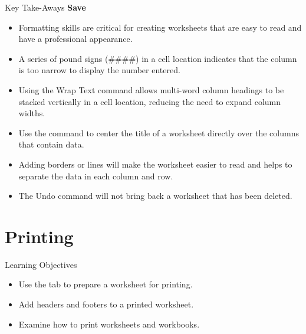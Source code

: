 \begin{center}
	\begin{tkwbox}{Key Take-Aways}
		\textbf{Save}
		\\
		\begin{itemize}
			\setlength{\itemsep}{0pt}
			\setlength{\parskip}{0pt}
			\setlength{\parsep}{0pt}
			
			\item Formatting skills are critical for creating worksheets that are easy to read and have a professional appearance.
			\item A series of pound signs (\#\#\#\#) in a cell location indicates that the column is too narrow to display the number entered.
			\item Using the Wrap Text command allows multi-word column headings to be stacked vertically in a cell location, reducing the need to expand column widths.
			\item Use the  command to center the title of a worksheet directly over the columns that contain data.
			\item Adding borders or lines will make the worksheet easier to read and helps to separate the data in each column and row.
			\item The Undo command will not bring back a worksheet that has been deleted.
		
		\end{itemize}
	\end{tkwbox}
\end{center}

\section{Printing}

\begin{center}
	\begin{objbox}{Learning Objectives}
		\begin{itemize}
			\setlength{\itemsep}{0pt}
			\setlength{\parskip}{0pt}
			\setlength{\parsep}{0pt}
			
			\item Use the  tab to prepare a worksheet for printing.
			\item Add headers and footers to a printed worksheet.
			\item Examine how to print worksheets and workbooks.
		\end{itemize}
	\end{objbox}
\end{center}

